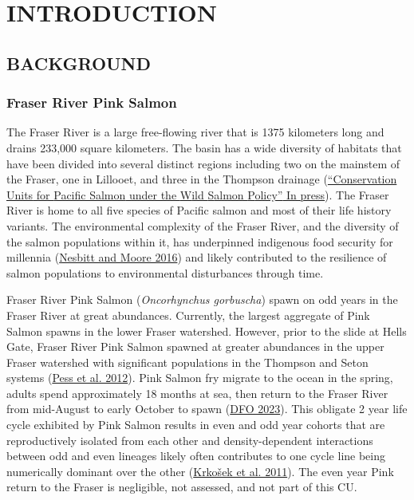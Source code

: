 \documentclass[11pt]{book}
\begin{document}
\frontmatter

\hypertarget{introduction}{%
\section{INTRODUCTION}\label{introduction}}

\hypertarget{background}{%
\subsection{BACKGROUND}\label{background}}

\hypertarget{fraser-river-pink-salmon}{%
\subsubsection{Fraser River Pink Salmon}\label{fraser-river-pink-salmon}}

The Fraser River is a large free-flowing river that is 1375 kilometers long and drains 233,000 square kilometers. The basin has a wide diversity of habitats that have been divided into several distinct regions including two on the mainstem of the Fraser, one in Lillooet, and three in the Thompson drainage (\protect\hyperlink{ref-holtbyConservationUnitsPacific2008}{{``Conservation {Units} for {Pacific Salmon} under the {W}ild {S}almon {P}olicy''} In press}). The Fraser River is home to all five species of Pacific salmon and most of their life history variants. The environmental complexity of the Fraser River, and the diversity of the salmon populations within it, has underpinned indigenous food security for millennia (\protect\hyperlink{ref-nesbittSpeciesPopulationDiversity2016}{Nesbitt and Moore 2016}) and likely contributed to the resilience of salmon populations to environmental disturbances through time.

Fraser River Pink Salmon (\emph{Oncorhynchus gorbuscha}) spawn on odd years in the Fraser River at great abundances. Currently, the largest aggregate of Pink Salmon spawns in the lower Fraser watershed. However, prior to the slide at Hells Gate, Fraser River Pink Salmon spawned at greater abundances in the upper Fraser watershed with significant populations in the Thompson and Seton systems (\protect\hyperlink{ref-pessInfluencePopulationDynamics2012}{Pess et al. 2012}). Pink Salmon fry migrate to the ocean in the spring, adults spend approximately 18 months at sea, then return to the Fraser River from mid-August to early October to spawn (\protect\hyperlink{ref-dfoSouthernSalmonIntegrated2023}{DFO 2023}). This obligate 2 year life cycle exhibited by Pink Salmon results in even and odd year cohorts that are reproductively isolated from each other and density-dependent interactions between odd and even lineages likely often contributes to one cycle line being numerically dominant over the other (\protect\hyperlink{ref-krkosek2011cycles}{Krkošek et al. 2011}). The even year Pink return to the Fraser is negligible, not assessed, and not part of this CU.
\end{document}
